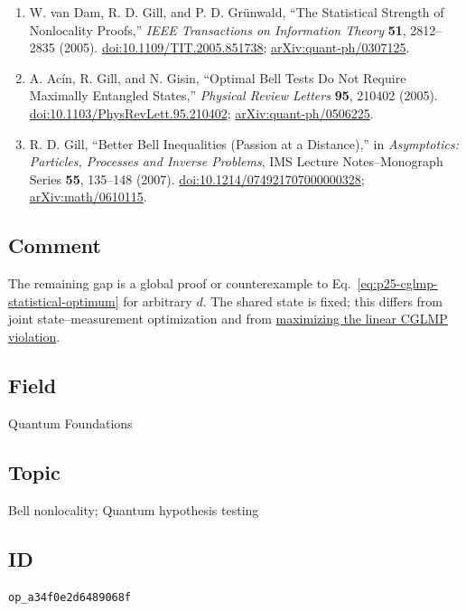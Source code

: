 \begin{enumerate}[label={},leftmargin=4.8em,labelsep=0.5em]
  \footnotesize
  \item[\textup{[DGG05]}]\label{ref:p25-statistical-strength}
  W. van Dam, R. D. Gill, and P. D. Grünwald,
  ``The Statistical Strength of Nonlocality Proofs,''
  \emph{IEEE Transactions on Information Theory} \textbf{51}, 2812--2835
  (2005).
  \href{https://doi.org/10.1109/TIT.2005.851738}{doi:10.1109/TIT.2005.851738};
  \href{https://arxiv.org/abs/quant-ph/0307125}{arXiv:quant-ph/0307125}.

  \item[\textup{[AGG05]}]\label{ref:p25-acin}
  A. Acín, R. Gill, and N. Gisin,
  ``Optimal Bell Tests Do Not Require Maximally Entangled States,''
  \emph{Physical Review Letters} \textbf{95}, 210402 (2005).
  \href{https://doi.org/10.1103/PhysRevLett.95.210402}{doi:10.1103/PhysRevLett.95.210402};
  \href{https://arxiv.org/abs/quant-ph/0506225}{arXiv:quant-ph/0506225}.

  \item[\textup{[Gil07]}]\label{ref:p25-gill}
  R. D. Gill, ``Better Bell Inequalities (Passion at a Distance),'' in
  \emph{Asymptotics: Particles, Processes and Inverse Problems}, IMS Lecture
  Notes--Monograph Series \textbf{55}, 135--148 (2007).
  \href{https://doi.org/10.1214/074921707000000328}{doi:10.1214/074921707000000328};
  \href{https://arxiv.org/abs/math/0610115}{arXiv:math/0610115}.
\end{enumerate}

\subsection*{Comment}

The remaining gap is a global proof or counterexample to
Eq.~\eqref{eq:p25-cglmp-statistical-optimum} for arbitrary $d$.  The shared
state is fixed; this differs from joint state--measurement optimization and
from \href{https://qiqc-op.com/problem/op_ccd560469b815618/}{maximizing the linear CGLMP violation}.

\subsection*{Field}

Quantum Foundations

\subsection*{Topic}

Bell nonlocality; Quantum hypothesis testing

\subsection*{ID}

\texttt{op\_a34f0e2d6489068f}
